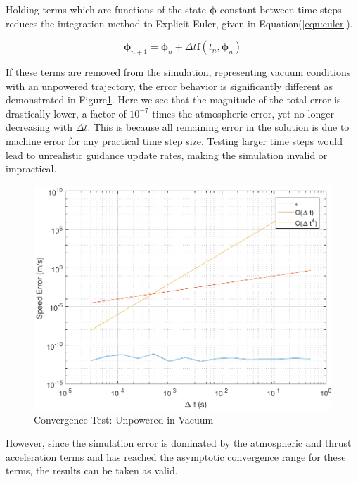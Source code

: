 Holding terms which are functions of the state $\bm{\phi}$ constant between time steps reduces the integration method to Explicit Euler, given in Equation\:(\ref{eqn:euler}). 

\begin{equation}
\label{eqn:euler}
\bm{\phi}_{n+1} = \bm{\phi}_n + \Delta t \bm{f}(t_n,\bm{\phi}_n)
\end{equation}

If these terms are removed from the simulation, representing vacuum conditions with an unpowered trajectory, the error behavior is significantly different as demonstrated in Figure\:\ref{fig:convtestvac}. Here we see that the magnitude of the total error is drastically lower, a factor of $10^{-7}$ times the atmospheric error, yet no longer decreasing with $\Delta t$. This is because all remaining error in the solution is due to machine error for any practical time step size. Testing larger time steps would lead to unrealistic guidance update rates, making the simulation invalid or impractical.


\begin{figure}[H]
	\centering
	\begin{minipage}{4.3 in}
		\includegraphics[width=\linewidth]{Figures/convtestvac.pdf}
		\caption{Convergence Test: Unpowered in Vacuum \label{fig:convtestvac} }
	\end{minipage}
\end{figure}

However, since the simulation error is dominated by the atmospheric and thrust acceleration terms and has reached the asymptotic convergence range for these terms, the results can be taken as valid.


